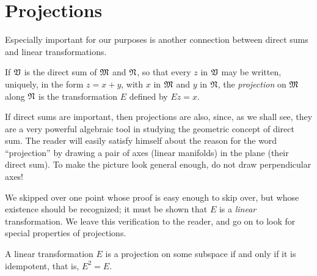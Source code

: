 \section{Projections}

Especially important for our purposes is another connection between direct sums
and linear transformations.

\begin{definition}
    If \(\mathfrak{V}\) is the direct sum of \(\frak{M}\) and \(\frak{N}\), so that every \(z\) in \(\mathfrak{V}\) may be written, uniquely, in the form \(z = x + y\), with \(x\) in \(\frak{M}\) and \(y\) in \(\frak{N}\), the \emph{projection} on \(\frak{M}\) along \(\frak{N}\) is the transformation \(E\) defined by \(Ez = x\).
\end{definition}

If direct sums are important, then projections are also, since, as we shall see,
they are a very powerful algebraic tool in studying the geometric concept of
direct sum. The reader will easily satisfy himself about the reason for the word
``projection'' by drawing a pair of axes (linear manifolds) in the plane (their
direct sum). To make the picture look general enough, do not draw perpendicular
axes!

We skipped over one point whose proof is easy enough to skip over, but whose
existence should be recognized; it must be shown that \(E\) is a \emph{linear}
transformation. We leave this verification to the reader, and go on to look for
special properties of projections.

\begin{theorem}
    A linear transformation \(E\) is a projection on some subspace if and only if it is idempotent, that is, \(E^2 = E\).
\end{theorem}

